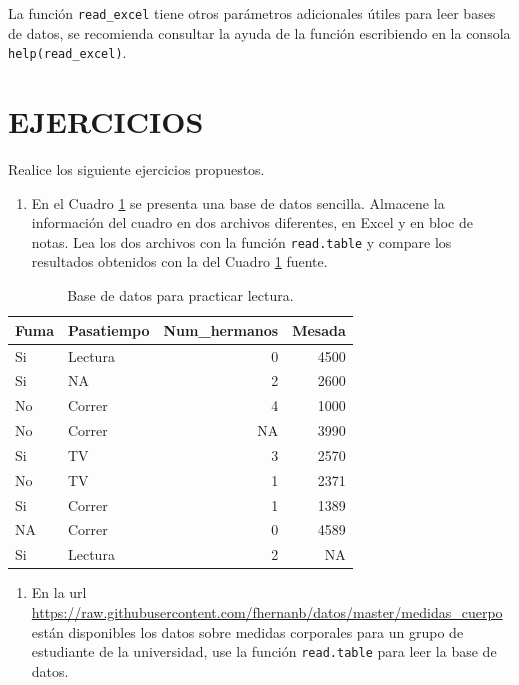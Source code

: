 \documentclass[10pt,]{krantz}
\providecommand{\tightlist}{%
  \setlength{\itemsep}{0pt}\setlength{\parskip}{0pt}}
\begin{document}
La función \texttt{read\_excel} tiene otros parámetros adicionales
útiles para leer bases de datos, se recomienda consultar la ayuda de la
función escribiendo en la consola \texttt{help(read\_excel)}.

\section*{EJERCICIOS}\label{ejercicios-3}


Realice los siguiente ejercicios propuestos.

\begin{enumerate}
\def\labelenumi{\arabic{enumi}.}
\tightlist
\item
  En el Cuadro \ref{tab:toy} se presenta una base de datos sencilla.
  Almacene la información del cuadro en dos archivos diferentes, en
  Excel y en bloc de notas. Lea los dos archivos con la función
  \texttt{read.table} y compare los resultados obtenidos con la del
  Cuadro \ref{tab:toy} fuente.
\end{enumerate}

\begin{table}

\caption{\label{tab:toy}Base de datos para practicar lectura.}
\centering
\begin{tabular}[t]{llrr}
\toprule
Fuma & Pasatiempo & Num\_hermanos & Mesada\\
\midrule
Si & Lectura & 0 & 4500\\
Si & NA & 2 & 2600\\
No & Correr & 4 & 1000\\
No & Correr & NA & 3990\\
Si & TV & 3 & 2570\\
\addlinespace
No & TV & 1 & 2371\\
Si & Correr & 1 & 1389\\
NA & Correr & 0 & 4589\\
Si & Lectura & 2 & NA\\
\bottomrule
\end{tabular}
\end{table}

\begin{enumerate}
\def\labelenumi{\arabic{enumi}.}
\setcounter{enumi}{1}
\tightlist
\item
  En la url
  \url{https://raw.githubusercontent.com/fhernanb/datos/master/medidas_cuerpo}
  están disponibles los datos sobre medidas corporales para un grupo de
  estudiante de la universidad, use la función \texttt{read.table} para
  leer la base de datos.
\end{enumerate}
\end{document}
